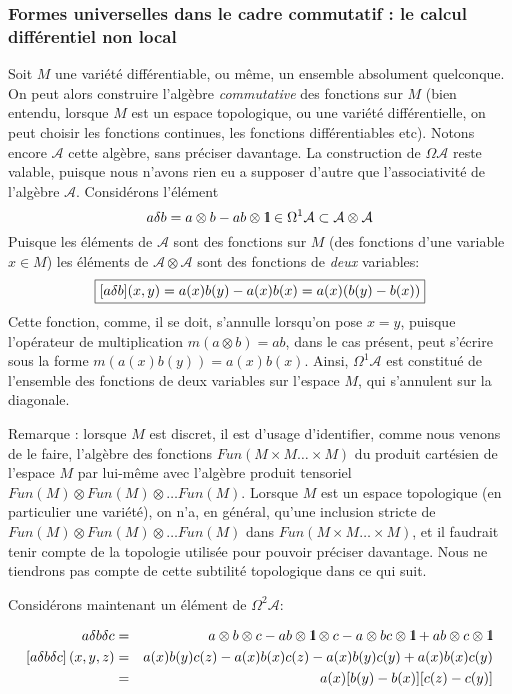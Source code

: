 	

	\subsubsection{Formes universelles dans le cadre commutatif : le calcul diff\'erentiel 
non local}
  Soit $M$ une vari\'et\'e diff\'erentiable, ou m\^eme, un ensemble 
absolument quelconque. On peut alors construire l'alg\`ebre 
{\it commutative} des fonctions sur $M$ (bien entendu, lorsque $M$ est un 
espace topologique, ou une
vari\'et\'e diff\'erentielle, on peut choisir les fonctions continues, les fonctions 
diff\'erentiables etc). Notons 
encore ${\mathcal A}$ cette alg\`ebre, sans pr\'eciser davantage.
La construction de $\Omega{\mathcal A}$ reste valable, puisque nous 
n'avons rien eu a supposer d'autre que l'associativit\'e de l'alg\`ebre ${\mathcal A}$.
Consid\'erons l'\'el\'ement $$a \delta b =a\otimes b - ab \otimes \mbox{\rm 1}\hskip-3pt \mbox{\rm l} \in 
\Omega^{1}{\mathcal A} \subset {\mathcal A} \otimes {\mathcal A}$$
Puisque les \'el\'ements de ${\mathcal A}$ sont des fonctions sur $M$ (des 
fonctions d'une variable $x \in M$) les 
\'el\'ements de ${\mathcal A} \otimes {\mathcal A}$ sont des fonctions 
de {\it deux} variables: 
$$
\mbox{\fbox{$
[a \delta b] (x,y) = a(x) b(y) - a(x) b(x) = a(x) (b(y) - b(x))
$}}
$$
Cette fonction, comme, il se doit, s'annulle lorsqu'on pose $x=y$, 
puisque l'op\'erateur de multiplication $m (a\otimes b) = ab$, dans le cas pr\'esent, 
peut s'\'ecrire sous la forme $m(a(x)b(y))=a(x)b(x)$. Ainsi, 
$\Omega^{1}{\mathcal A}$ est constitu\'e de l'ensemble des fonctions de 
deux variables sur l'espace $M$, qui s'annulent sur la diagonale.

Remarque : lorsque $M$ est discret, il est d'usage d'identifier, 
comme nous venons de le faire,
l'alg\`ebre des fonctions $Fun(M \times M \ldots \times M)$ du produit cart\'esien  
de l'espace $M$ par lui-m\^eme avec l'alg\`ebre produit tensoriel $Fun(M) \otimes 
Fun(M) \otimes \ldots Fun(M)$. Lorsque $M$ est un espace topologique 
(en particulier une vari\'et\'e), on n'a, en g\'en\'eral, qu'une inclusion stricte
 de $Fun(M) \otimes Fun(M) \otimes \ldots Fun(M)$ dans $Fun(M \times M \ldots 
\times M)$, et il faudrait tenir compte de la topologie utilis\'ee pour 
pouvoir pr\'eciser davantage. Nous ne tiendrons pas compte de cette 
subtilit\'e topologique dans ce qui suit.


Consid\'erons maintenant un \'el\'ement de $\Omega^{2}{\mathcal A}$:

\begin{eqnarray*}
a \delta b \delta c 
& = & a \otimes b \otimes c - ab\otimes \mbox{\rm 1}\hskip-3pt \mbox{\rm l} \otimes c - a \otimes b c \otimes \mbox{\rm 1}\hskip-3pt \mbox{\rm l} + a  b\otimes c \otimes \mbox{\rm 1}\hskip-3pt \mbox{\rm l} \cr	  
[a \delta b \delta c] \, (x,y,z) & = & a(x) b(y) c(z) - 
a(x) b(x) c(z) - a(x) b(y) c(y) + a(x)  b(x) c(y) \cr 
& = & a(x)[b(y) - b(x)][c(z) - c(y)]
\end{eqnarray*}

